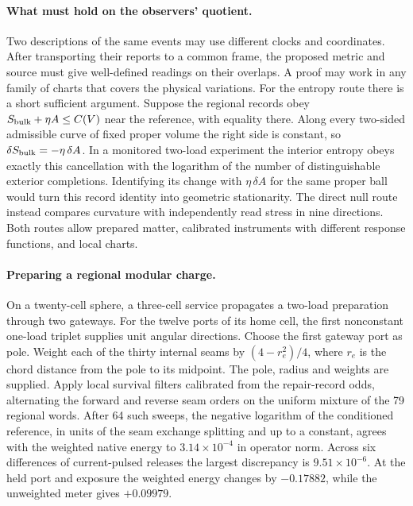 \documentclass[11pt]{article}
\begin{document}
\paragraph{What must hold on the observers' quotient.}
Two descriptions of the same events may use different clocks and coordinates.
After transporting their reports to a common frame, the proposed metric and
source must give well-defined readings on their overlaps. A proof may work in
any family of charts that covers the physical variations. For the entropy
route there is a short sufficient argument. Suppose the regional records
obey $S_{\rm bulk}+\eta A\leq C(V)$ near the reference, with equality
there. Along every two-sided admissible curve of fixed proper volume the
right side is constant, so $\delta S_{\rm bulk}=-\eta\,\delta A$.
In a monitored two-load experiment the interior entropy obeys exactly this
cancellation with the logarithm of the number of distinguishable exterior
completions. Identifying its change with $\eta\,\delta A$ for the same
proper ball would turn this record identity into geometric stationarity.
The direct null route instead compares curvature with independently read
stress in nine directions. Both routes allow prepared matter, calibrated
instruments with different response functions, and local charts.

\paragraph{Preparing a regional modular charge.}
On a twenty-cell sphere, a three-cell service propagates a two-load
preparation through two gateways. For the twelve ports of its home cell,
the first nonconstant one-load triplet supplies unit angular directions.
Choose the first gateway port as pole. Weight each of the thirty internal
seams by $(4-r_e^2)/4$, where $r_e$ is the chord distance from the pole
to its midpoint. The pole, radius and weights are supplied. Apply local
survival filters calibrated from the repair-record odds, alternating the
forward and reverse seam orders on the uniform mixture of the 79 regional
words. After 64 such sweeps, the negative logarithm of the conditioned reference,
in units of the seam exchange splitting and up to a constant, agrees with
the weighted native energy to $3.14\times10^{-4}$ in operator norm.
Across six differences of current-pulsed releases the largest discrepancy
is $9.51\times10^{-6}$. At the held port and exposure the weighted energy
changes by $-0.17882$, while the unweighted meter gives $+0.09979$.
\end{document}
